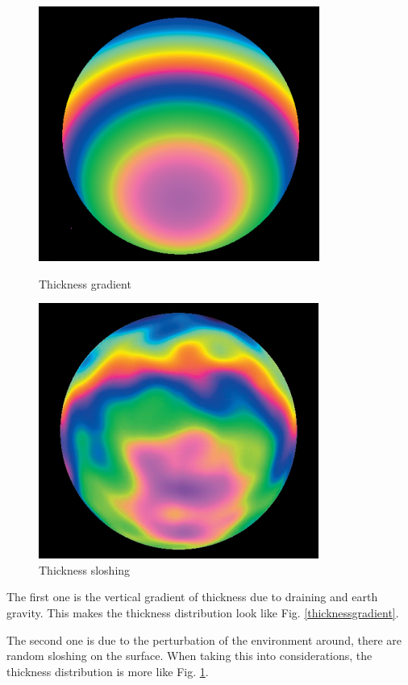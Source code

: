 \documentclass[9pt, conference]{IEEEtran}
\begin{document}
\begin{figure}
	\vspace{-15pt}
	\centering
	\includegraphics[width=0.5\linewidth]{thickness_gradient.png}
	\vspace{-10pt}
	\caption{\label{thicknessgradient}Thickness gradient \cite{888023}}
	\vspace{5pt}
	\includegraphics[width=0.5\linewidth]{thickness_sloshing.png}
	\vspace{-10pt}
	\caption{\label{thicknesssloaching}Thickness sloshing \cite{888023}}
	\vspace{-10pt}
\end{figure}
The first one is the vertical gradient of thickness due to draining and earth gravity. This makes the thickness distribution look like Fig. \ref{thicknessgradient}.

The second one is due to the perturbation of the environment around, there are random sloshing on the surface. When taking this into considerations, the thickness distribution is more like Fig. \ref{thicknesssloaching}.
\end{document}
